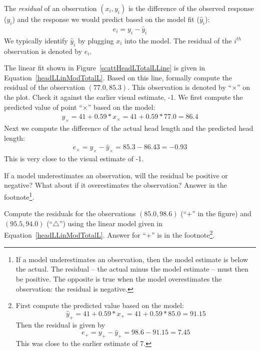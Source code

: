 \begin{termBox}{
The \emph{residual} of an observation $(x_i, y_i)$ is the difference of the observed response ($y_i$) and the response we would predict based on the model fit ($\hat{y}_i$):
\begin{eqnarray*}
e_i = y_i - \hat{y}_i
\end{eqnarray*}
We typically identify $\hat{y}_i$ by plugging $x_i$ into the model. The residual of the $i^{th}$ observation is denoted by $e_i$.}
\end{termBox}

\begin{example}{The linear fit shown in Figure~\ref{scattHeadLTotalLLine} is given in Equation~\eqref{headLLinModTotalL}. Based on this line, formally compute the residual of the observation $(77.0, 85.3)$. This observation is denoted by ``$\times$'' on the plot. Check it against the earlier visual estimate, -1.}
We first compute the predicted value of point ``$\times$'' based on the model:
\begin{eqnarray*}
\hat{y}_{\times} = 41+0.59*x_{\times} = 41+0.59*77.0 = 86.4
\end{eqnarray*}
Next we compute the difference of the actual head length and the predicted head length:
\begin{eqnarray*}
e_{\times} = y_{\times} - \hat{y}_{\times} = 85.3 -  86.43 = -0.93
\end{eqnarray*}
This is very close to the visual estimate of -1.
\end{example}

\begin{exercise}
If a model underestimates an observation, will the residual be positive or negative? What about if it overestimates the observation? Answer in the footnote\footnote{If a model underestimates an observation, then the model estimate is below the actual. The residual -- the actual minus the model estimate -- must then be positive. The opposite is true when the model overestimates the observation: the residual is negative.}.
\end{exercise}

\begin{exercise}
Compute the residuals for the observations $(85.0, 98.6)$ (``$+$'' in the figure) and $(95.5, 94.0)$ (``$\triangle$'') using the linear model given in Equation~\eqref{headLLinModTotalL}. Answer for ``$+$'' is in the footnote\footnote{First compute the predicted value based on the model: $$\hat{y}_{+} = 41+0.59*x_{+} = 41+0.59*85.0 = 91.15$$ Then the residual is given by $$e_{+} = y_{+} - \hat{y}_{+} = 98.6-91.15=7.45$$This was close to the earlier estimate of 7.}.
\end{exercise}

